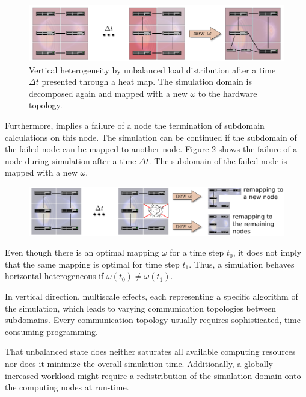 \begin{figure}[H]
  \centering \includegraphics[width=\textwidth]{graphics/30_load_balancing}
  \caption{Vertical heterogeneity by unbalanced load distribution
    after a time $\Delta t$ presented through a heat map.  The
    simulation domain is decomposed again and mapped with a new
    $\omega$ to the hardware topology.}
  \label{fig:load_balancing}
\end{figure}

\noindent Furthermore, implies a failure of a node the termination of subdomain
calculations on this node. The simulation can be continued if the
subdomain of the failed node can be mapped to another node. Figure \ref{fig:resilience}
shows the failure of a node during simulation after a time $\Delta t$.
The subdomain of the failed node is mapped with a new $\omega$.

\begin{figure}[H]
  \centering \includegraphics[width=\textwidth]{graphics/30_resilience}
  \caption{ }
  \label{fig:resilience}
\end{figure}

Even though there is an optimal mapping $\omega$ for a time step
$t_0$, it does not imply that the same mapping is optimal for time
step $t_1$.  Thus, a simulation behaves horizontal heterogeneous if
$\omega(t_0) \neq \omega(t_1)$.

In vertical
direction, multiscale effects, each representing a specific algorithm
of the simulation, which leads to varying communication topologies between
subdomains. Every communication topology usually requires
sophisticated, time consuming programming. 


That unbalanced
state does neither saturates all available computing resources nor does it
minimize the overall simulation time. Additionally, a globally
increased workload might require a redistribution of the simulation
domain onto the computing nodes at run-time.

